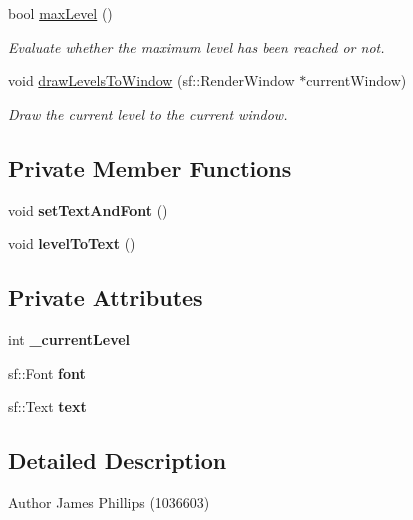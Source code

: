 \begin{DoxyCompactItemize}
bool \hyperlink{class_level_a702a1a057a4572ea37b701126501621a}{max\+Level} ()
\begin{DoxyCompactList}\small\item\em Evaluate whether the maximum level has been reached or not. \end{DoxyCompactList}\item 
void \hyperlink{class_level_a4cdf43966bbd49ea4f392762c4cd7991}{draw\+Levels\+To\+Window} (sf\+::\+Render\+Window $\ast$current\+Window)
\begin{DoxyCompactList}\small\item\em Draw the current level to the current window. \end{DoxyCompactList}\end{DoxyCompactItemize}
\subsection*{Private Member Functions}
\begin{DoxyCompactItemize}
\item 
\mbox{\label{class_level_aa726d09473bbb551477994c70e516a99}} 
void {\bfseries set\+Text\+And\+Font} ()
\item 
\mbox{\label{class_level_a0d5d67c406bf3ee9eb5be34718345b40}} 
void {\bfseries level\+To\+Text} ()
\end{DoxyCompactItemize}
\subsection*{Private Attributes}
\begin{DoxyCompactItemize}
\item 
\mbox{\label{class_level_a70f3892ab0296e9ab92798b62d1dc894}} 
int {\bfseries \+\_\+current\+Level}
\item 
\mbox{\label{class_level_af8ac9bfc42fb1b12b12538e2b9c170e7}} 
sf\+::\+Font {\bfseries font}
\item 
\mbox{\label{class_level_a4f0d652d48634a83436f314c0581ac23}} 
sf\+::\+Text {\bfseries text}
\end{DoxyCompactItemize}


\subsection{Detailed Description}
\begin{DoxyAuthor}{Author}
James Phillips (1036603) 
\end{DoxyAuthor}


